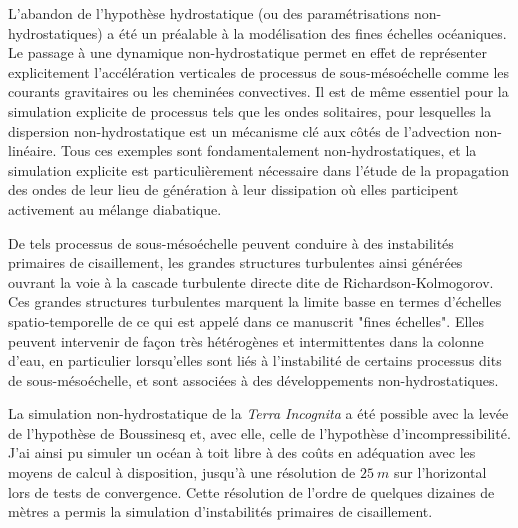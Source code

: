 L'abandon de l'hypothèse hydrostatique (ou des paramétrisations non-hydrostatiques) a été un préalable à la modélisation des fines échelles océaniques. Le passage à une dynamique non-hydrostatique permet en effet de représenter explicitement l'accélération verticales de processus de sous-mésoéchelle comme les courants gravitaires ou les cheminées convectives. Il est de même essentiel pour la simulation explicite de processus tels que les ondes solitaires, pour lesquelles la dispersion non-hydrostatique est un mécanisme clé aux côtés de l'advection non-linéaire. Tous ces exemples sont fondamentalement non-hydrostatiques, et la simulation explicite est particulièrement nécessaire dans l'étude de la propagation des ondes de leur lieu de génération à leur dissipation où elles participent activement au mélange diabatique. %



De tels processus de sous-mésoéchelle peuvent conduire à des instabilités primaires de cisaillement, les grandes structures turbulentes ainsi générées ouvrant la voie à la cascade turbulente directe dite de Richardson-Kolmogorov. Ces grandes structures turbulentes marquent la limite basse en termes d'échelles spatio-temporelle de ce qui est appelé dans ce manuscrit "fines échelles". Elles peuvent intervenir de façon très hétérogènes et intermittentes dans la colonne d'eau, en particulier lorsqu'elles sont liés à l'instabilité de certains processus dits de sous-mésoéchelle, et sont associées à des développements non-hydrostatiques.%

La simulation non-hydrostatique de la \textit{Terra Incognita} a été possible avec la levée de l'hypothèse de Boussinesq et, avec elle, celle de l'hypothèse d'incompressibilité. J'ai ainsi pu simuler un océan à toit libre à des coûts en adéquation avec les moyens de calcul à disposition, jusqu'à une résolution de $25\ m$ sur l'horizontal lors de tests de convergence. Cette résolution de l'ordre de quelques dizaines de mètres a permis la simulation d'instabilités primaires de cisaillement.

